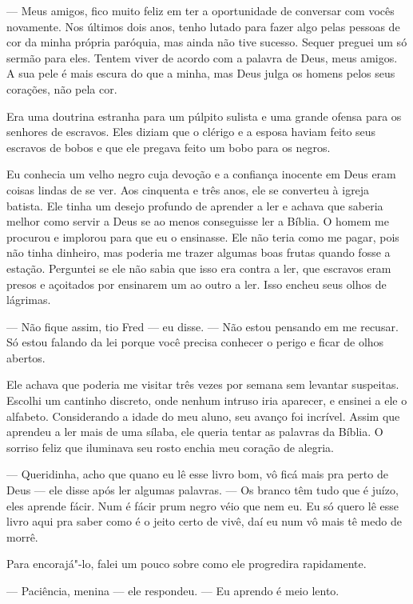 --- Meus amigos, fico muito feliz em ter a oportunidade de conversar com
vocês novamente. Nos últimos dois anos, tenho lutado para fazer algo
pelas pessoas de cor da minha própria paróquia, mas ainda não tive
sucesso. Sequer preguei um só sermão para eles. Tentem viver de acordo
com a palavra de Deus, meus amigos. A sua pele é mais escura do que a
minha, mas Deus julga os homens pelos seus corações, não pela cor.

Era uma doutrina estranha para um púlpito sulista e uma grande ofensa
para os senhores de escravos. Eles diziam que o clérigo e a esposa
haviam feito seus escravos de bobos e que ele pregava feito um bobo para
os negros.

Eu conhecia um velho negro cuja devoção
e a confiança inocente em Deus eram coisas lindas de se ver. Aos
cinquenta e três anos, ele se converteu à igreja batista. Ele tinha um
desejo profundo de aprender a ler e achava que saberia melhor como
servir a Deus se ao menos conseguisse ler a Bíblia. O homem me procurou
e implorou para que eu o ensinasse. Ele não teria como me pagar, pois
não tinha dinheiro, mas poderia me trazer algumas boas frutas quando
fosse a estação. Perguntei se ele não sabia que isso era contra a ler,
que escravos eram presos e açoitados por ensinarem um ao outro a ler.
Isso encheu seus olhos de lágrimas.

--- Não fique assim, tio Fred --- eu disse. --- Não estou pensando em me
recusar. Só estou falando da lei porque você precisa conhecer o perigo e
ficar de olhos abertos.

Ele achava que poderia me visitar três vezes por semana sem levantar
suspeitas. Escolhi um cantinho discreto, onde nenhum intruso iria
aparecer, e ensinei a ele o alfabeto. Considerando a idade do meu aluno,
seu avanço foi incrível. Assim que aprendeu a ler mais de uma sílaba,
ele queria tentar as palavras da Bíblia. O sorriso feliz que iluminava
seu rosto enchia meu coração de alegria.

--- Queridinha, acho que quano eu lê esse livro bom, vô ficá mais pra
perto de Deus --- ele disse após ler algumas palavras. --- Os branco têm
tudo que é juízo, eles aprende fácir. Num é fácir prum negro véio que
nem eu. Eu só quero lê esse livro aqui pra saber como é o jeito certo de
vivê, daí eu num vô mais tê medo de morrê.

Para encorajá"-lo, falei um pouco sobre
como ele progredira rapidamente.

--- Paciência, menina --- ele respondeu. --- Eu aprendo é meio lento.

